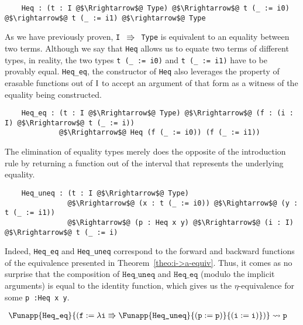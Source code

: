 \documentclass[12pt,twoside,maitrise]{dms}
\theoremstyle{definition}
\numberwithin{equation}{section}
\numberwithin{table}{chapter}
\numberwithin{figure}{chapter}
\newcommand\id[1] {\texttt{#1}}
\newcommand\fn[1] {\texttt{#1}}
\begin{document}
\begin{verbatim}
    Heq : (t : I @$\Rrightarrow$@ Type) @$\Rrightarrow$@ t (_ := i0) @$\rightarrow$@ t (_ := i1) @$\rightarrow$@ Type
\end{verbatim}

As we have previously proven, \fn{I $\Rrightarrow$ Type} is equivalent to an
equality between two terms. Although we say that \fn{Heq} allows us to equate
two terms of different types, in reality, the two types \fn{t (\_ := i0)} and
\fn{t (\_ := i1)} have to be provably equal. \id{Heq\_eq}, the constructor of
\id{Heq} also leverages the property of erasable functions out of $\mathrm{I}$ to
accept an argument of that form as a witness of the equality being constructed.


\begin{verbatim}
    Heq_eq : (t : I @$\Rrightarrow$@ Type) @$\Rrightarrow$@ (f : (i : I) @$\Rrightarrow$@ t (_ := i))
             @$\Rrightarrow$@ Heq (f (_ := i0)) (f (_ := i1))
\end{verbatim}

The elimination of equality types merely does the opposite of the introduction
rule by returning a function out of the interval that represents the underlying
equality.

\begin{verbatim}
    Heq_uneq : (t : I @$\Rrightarrow$@ Type)
               @$\Rrightarrow$@ (x : t (_ := i0)) @$\Rightarrow$@ (y : t (_ := i1))
               @$\Rightarrow$@ (p : Heq x y) @$\Rrightarrow$@ (i : I) @$\Rrightarrow$@ t (_ := i)
\end{verbatim}

Indeed, \id{Heq\_eq} and \id{Heq\_uneq} correspond to the forward and backward
functions of the equivalence presented in Theorem~\ref{theo:i->a-equiv}. Thus,
it comes as no surprise that the composition of $\id{Heq\_uneq}$ and
$\id{Heq\_eq}$ (modulo the implicit arguments) is equal to the identity
function, which gives us the $\eta$-equivalence for some \fn{p :\@ Heq x y}.

\begin{align*}
  & \Funapp{\id{Heq\_eq}}{(\earg{\id{f}}{\lambda \id{i} \Rrightarrow
      \Funapp{\id{Heq\_uneq}}{(\earg{\id{p}}{\id{p}})}{(\earg{\id{i}}{\id{i}})}})} \rightsquigarrow{} \id{p}
\end{align*}
\end{document}
